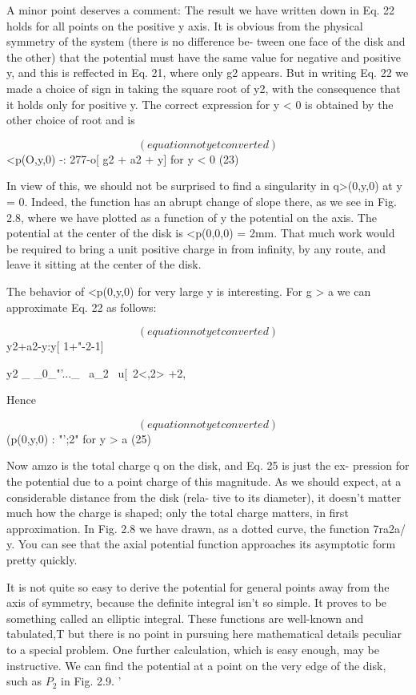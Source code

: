 A minor point deserves a comment: The result we have written
down in Eq. 22 holds for all points on the positive y axis. It is obvious
from the physical symmetry of the system (there is no difference be-
tween one face of the disk and the other) that the potential must have
the same value for negative and positive y, and this is reffected in
Eq. 21, where only g2 appears. But in writing Eq. 22 we made a
choice of sign in taking the square root of y2, with the consequence
that it holds only for positive y. The correct expression for y < 0 is
obtained by the other choice of root and is

\begin{equation}
(equation not yet converted)
\end{equation}
<p(O,y,0) -: 277-o[ \/g2 + a2 + y] for y < 0 (23)

In view of this, we should not be surprised to find a singularity in
q>(0,y,0) at y = 0. Indeed, the function has an abrupt change of
slope there, as we see in Fig. 2.8, where we have plotted as a function
of y the potential on the axis. The potential at the center of the disk
is <p(0,0,0) = 2mm. That much work would be required to bring a
unit positive charge in from infinity, by any route, and leave it sitting
at the center of the disk.

The behavior of <p(0,y,0) for very large y is interesting. For g > a
we can approximate Eq. 22 as follows:

\begin{equation}
(equation not yet converted)
\end{equation}
\/y2+a2-y:y[ 1+"-2-1]

y2
_ _0_"'..._ ~a_2
~u[~2<,2> +2, 

Hence

\begin{equation}
(equation not yet converted)
\end{equation}
(p(0,y,0) : "';2" for y > a (25)

Now amzo is the total charge q on the disk, and Eq. 25 is just the ex-
pression for the potential due to a point charge of this magnitude.
As we should expect, at a considerable distance from the disk (rela-
tive to its diameter), it doesn't matter much how the charge is shaped;
only the total charge matters, in first approximation. In Fig. 2.8 we
have drawn, as a dotted curve, the function 7ra2a/ y. You can see that
the axial potential function approaches its asymptotic form pretty
quickly.

It is not quite so easy to derive the potential for general points
away from the axis of symmetry, because the definite integral isn't so
simple. It proves to be something called an elliptic integral. These
functions are well-known and tabulated,T but there is no point in
pursuing here mathematical details peculiar to a special problem.
One further calculation, which is easy enough, may be instructive.
We can find the potential at a point on the very edge of the disk, such
as $P_2$ in Fig. 2.9. '

